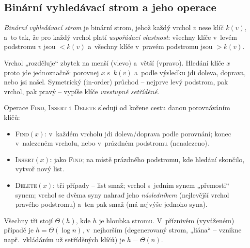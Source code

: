 \documentclass[11pt,a4paper]{article}
\begin{document}
\subsection{Binární vyhledávací strom a jeho operace}

\begin{definice}
\emph{Binární vyhledávací strom} je binární strom, jehož každý vrchol $v$ nese klíč $k(v)$, a~to tak, že pro každý vrchol platí \emph{uspořádací vlastnost}: všechny klíče v~levém podstromu $v$ jsou $<k(v)$ a~všechny klíče v~pravém podstromu jsou $>k(v)$.
\end{definice}

\begin{intuice}
Vrchol „rozděluje`` zbytek na menší (vlevo) a~větší (vpravo). Hledání klíče $x$ proto jde jednoznačně: porovnej $x$ s~$k(v)$ a~podle výsledku jdi doleva, doprava, nebo jsi našel. Symetrický (in-order) průchod -- nejprve levý podstrom, pak vrchol, pak pravý -- vypíše klíče \emph{vzestupně setříděné}.
\end{intuice}

Operace \textsc{Find}, \textsc{Insert} i~\textsc{Delete} sledují od kořene cestu danou porovnáváním klíčů:
\begin{itemize}
  \item \textsc{Find}$(x)$: v~každém vrcholu jdi doleva/doprava podle porovnání; konec v~nalezeném vrcholu, nebo v~prázdném podstromu (nenalezeno).
  \item \textsc{Insert}$(x)$: jako \textsc{Find}; na místě prázdného podstromu, kde hledání skončilo, vytvoř nový list.
  \item \textsc{Delete}$(x)$: tři případy -- list smaž; vrchol s~jedním synem „přemosti`` synem; vrchol se dvěma syny nahraď jeho \emph{následníkem} (nejlevější vrchol pravého podstromu) a~ten pak smaž (má nejvýše jednoho syna).
\end{itemize}
Všechny tři stojí $\Theta(h)$, kde $h$ je hloubka stromu. V~příznivém (vyváženém) případě je $h=\Theta(\log n)$, v~nejhorším (degenerovaný strom, „liána`` -- vznikne např.\ vkládáním už setříděných klíčů) je $h=\Theta(n)$.
\end{document}
